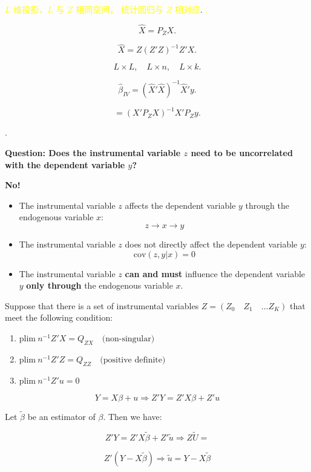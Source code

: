 \documentclass[12pt, oneside]{article}
\begin{document}
\textcolor{yellow}{\( L \) 维投影，\( L \) 与 \( Z \) 相同空间， 统计回归与 \( Z \) 相对应}.
\textcolor{yellow}{.}

\[
\hat{X} = P_Z X.
\]

\[
\hat{X} = Z (Z'Z)^{-1} Z' X.
\]

\[
L \times L, \quad L \times n, \quad L \times k.
\]

\[
\hat{\beta}_{IV} = (\hat{X}' \hat{X})^{-1} \hat{X}' y.
\]

\[
= (X' P_Z X)^{-1} X' P_Z y.
\]

\textcolor{blue}{}.

\textbf{Question: Does the instrumental variable \( z \) need to be uncorrelated with the dependent variable \( y \)?}

\textbf{No!}

\begin{itemize}
    \item The instrumental variable \( z \) affects the dependent variable \( y \) through the endogenous variable \( x \):
    \[
    z \to x \to y
    \]
    \item The instrumental variable \( z \) does not directly affect the dependent variable \( y \):
    \[
    \text{cov}(z, y | x) = 0
    \]
    \item The instrumental variable \( z \) \textbf{can and must} influence the dependent variable \( y \) \textbf{only through} the endogenous variable \( x \).
\end{itemize}

Suppose that there is a set of instrumental variables \( Z = (Z_0 \quad Z_1 \quad \dots Z_K) \) 
that meet the following condition:

\begin{enumerate}
    \item \( \text{plim} \ n^{-1}Z'X = Q_{ZX} \quad \text{(non-singular)} \)
    \item \( \text{plim} \ n^{-1}Z'Z = Q_{ZZ} \quad \text{(positive definite)} \)
    \item \( \text{plim} \ n^{-1}Z'u = 0 \)
\end{enumerate}

\[
Y = X\beta + u \Rightarrow Z'Y = Z'X\beta + Z'u
\]

Let \( \tilde{\beta} \) be an estimator of \( \beta \). Then we have:

\[
Z'Y = Z'X\tilde{\beta} + Z'\tilde{u} \Rightarrow Z\tilde{U} =
\]

\[
Z'(Y - X\tilde{\beta}) \Rightarrow \tilde{u} = Y - X\tilde{\beta}
\]
\end{document}
